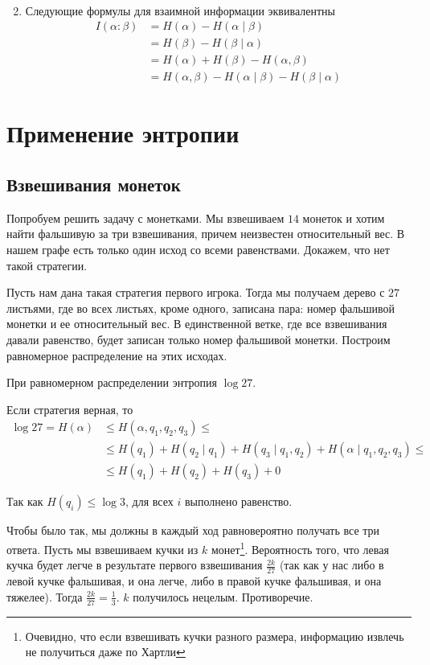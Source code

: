 \begin{prop}
\begin{enumerate}
\begin{proof*}
\begin{align*}
		    \end{align*}
		\end{proof*}
		\item  Следующие формулы для взаимной информации эквивалентны
			\begin{align*}
				I( \alpha : \beta ) &= H( \alpha) - H( \alpha  \mid \beta  ) \\
										 &= H( \beta ) - H( \beta \mid \alpha ) \\
										 &= H\left( \alpha  \right) + H( \beta ) - H( \alpha , \beta ) \\
										 &= H( \alpha , \beta ) - H( \alpha \mid \beta ) - H( \beta \mid \alpha )
			\end{align*}
	\end{enumerate}
\end{prop}

\section{Применение энтропии}
\subsection{Взвешивания монеток}
Попробуем решить задачу с монетками. Мы взвешиваем $ 14$ монеток и хотим найти фальшивую за три взвешивания, причем неизвестен относительный вес. В нашем графе есть только один исход со всеми равенствами. Докажем, что нет такой стратегии.

Пусть нам дана такая стратегия первого игрока.
Тогда мы получаем дерево с $ 27$ листьями, где во всех листьях, кроме одного, записана пара:
номер фальшивой монетки и ее относительный вес.
В единственной ветке, где все взвешивания давали равенство, будет записан только номер фальшивой монетки.
Построим равномерное распределение на этих исходах.

При равномерном распределении энтропия $ \log 27$.

Если стратегия верная, то
\begin{align*}
\log 27 = H(\alpha) &\le  H( \alpha, q_1, q_2, q_3) \le \\ &\le H( q_1 ) + H(q_{2} \mid q_1 )+ H(q_3 \mid q_1, q_2)+ H( \alpha  \mid q_1, q_2, q_3 ) \le \tag{Chain rule}\\  
			& \le  H(q_1) + H(q_2) + H(q_3) + 0
\end{align*}

Так как $ H(q_i) \le  \log 3$, для всех $ i$ выполнено равенство.

Чтобы было так, мы должны в каждый ход равновероятно получать все три ответа.
Пусть мы взвешиваем кучки из $ k$ монет\footnote{Очевидно, что если взвешивать кучки разного размера, информацию извлечь не получиться даже по Хартли}. 
Вероятность того, что левая кучка будет легче в результате первого взвешивания $\frac{2k}{27}$ (так как у нас либо в левой кучке фальшивая, и она легче, либо в правой кучке фальшивая, и она тяжелее). Тогда $\frac{2k}{27} = \frac{1}{3}$. $k$ получилось нецелым.
Противоречие.

